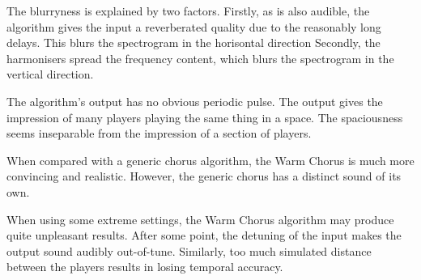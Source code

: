 The blurryness is explained by two factors. Firstly, as is also audible, the algorithm gives the input a reverberated quality due to the reasonably long delays. This blurs the spectrogram in the horisontal direction Secondly, the harmonisers spread the frequency content, which blurs the spectrogram in the vertical direction.

The algorithm's output has no obvious periodic pulse. The output gives the impression of many players playing the same thing in a space. The spaciousness seems inseparable from the impression of a section of players.

When compared with a generic chorus algorithm, the Warm Chorus is much more convincing and realistic. However, the generic chorus has a distinct sound of its own.

When using some extreme settings, the Warm Chorus algorithm may produce quite unpleasant results. After some point, the detuning of the input makes the output sound audibly out-of-tune. Similarly, too much simulated distance between the players results in losing temporal accuracy.
